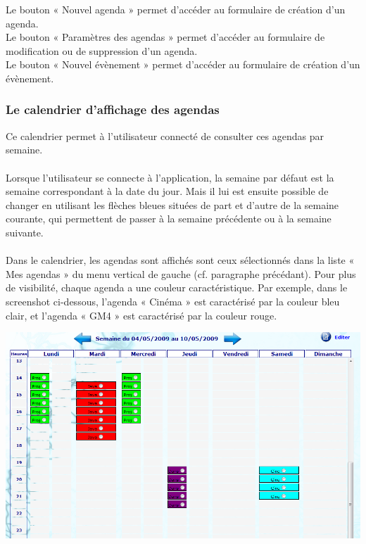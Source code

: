 \documentclass[12pt , a4paper]{article}
\begin{document}
\noindent Le bouton « Nouvel agenda » permet d’accéder au
formulaire de création d’un agenda.\\
\noindent Le bouton « Paramètres des agendas » permet d’accéder au
formulaire de modification ou de suppression d’un agenda.\\
\noindent Le bouton « Nouvel évènement » permet d’accéder au
formulaire de création d’un évènement.\\





\subsubsection{Le calendrier d'affichage des agendas}
\noindent Ce calendrier permet à l’utilisateur connecté de consulter ces agendas par semaine.\\ \\
Lorsque l’utilisateur se connecte à l’application, la semaine par défaut est la semaine
correspondant à la date du jour. Mais il lui est ensuite possible de changer en utilisant les
flèches bleues situées de part et d’autre de la semaine courante, qui permettent de passer à la
semaine précédente ou à la semaine suivante. \\ \\
Dans le calendrier, les agendas sont affichés sont ceux sélectionnés dans la liste « Mes agendas »
du menu vertical de gauche (cf. paragraphe précédant). Pour plus de visibilité, chaque agenda
a une couleur caractéristique. Par exemple, dans le screenshot ci-dessous, l’agenda « Cinéma »
est caractérisé par la couleur bleu clair, et l’agenda « GM4 » est caractérisé par la couleur
rouge.

\begin{center}
  \includegraphics[scale=0.6]{./images/calendrier_agenda.png}
\end{center}
\end{document}
